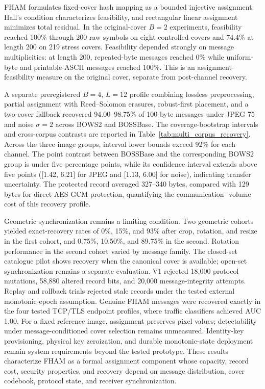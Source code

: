 \documentclass[preprint,12pt]{elsarticle}
\theoremstyle{plain}
\begin{document}
FHAM formulates fixed-cover hash mapping as a bounded injective assignment:
Hall's condition characterizes feasibility, and rectangular linear assignment
minimizes total residual. In the original-cover $B=2$ experiments, feasibility
reached 100\% through 200 raw symbols on eight controlled covers and 74.4\%
at length 200 on 219 stress covers. Feasibility depended strongly on message
multiplicities: at length 200, repeated-byte messages reached 0\% while
uniform-byte and printable-ASCII messages reached 100\%. This is an
assignment-feasibility measure on the original cover, separate from post-channel recovery.

A separate preregistered $B=4$, $L=12$ profile combining lossless preprocessing,
partial assignment with Reed--Solomon erasures, robust-first placement, and a
two-cover fallback recovered 94.00--98.75\% of 100-byte messages under JPEG
75 and noise $\sigma=2$ across BOWS2 and BOSSBase. The coverage-bootstrap
intervals and cross-corpus contrasts are reported in Table~\ref{tab:multi_corpus_recovery}.
Across the three image groups, interval lower bounds exceed 92\% for each
channel. The point contrast between BOSSBase and the corresponding BOWS2
group is under five percentage points, while its confidence interval extends
above five points ([1.42, 6.21] for JPEG and [1.13, 6.00] for noise), indicating
transfer uncertainty. The protected record averaged 327--340 bytes, compared
with 129 bytes for direct AES-GCM protection, quantifying the communication-
volume cost of this recovery profile.

Geometric synchronization remains a limiting condition. Two geometric cohorts yielded exact-recovery rates of 0\%, 15\%, and 93\%
after crop, rotation, and resize in the first cohort, and 0.75\%, 10.50\%,
and 89.75\% in the second. Rotation performance in the second cohort varied
by message family. The closed-set
catalogue pilot shows recovery when the canonical cover is available; open-set
synchronization remains a separate evaluation. V1 rejected 18,000 protocol
mutations, 58,880 altered record bits, and 20,000 message-integrity attempts.
Replay and rollback trials rejected stale records under the tested external
monotonic-epoch assumption. Genuine FHAM messages were recovered exactly in
the four tested TCP/TLS endpoint profiles, where traffic classifiers achieved
AUC 1.00. For a fixed reference image, assignment preserves pixel values;
detectability under message-conditioned cover selection remains unmeasured.
Identity-key provisioning, physical key zeroization, and durable monotonic-state
deployment remain system requirements beyond the tested prototype. These results
characterize FHAM as a formal assignment component whose capacity, record
cost, security properties, and recovery depend on message distribution, cover
codebook, protocol state, and receiver synchronization.
\end{document}
